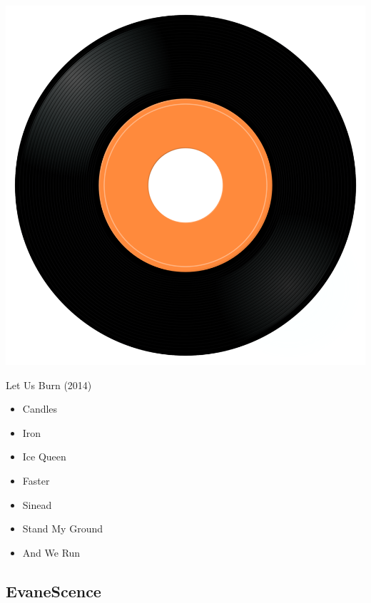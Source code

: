 \begin{minipage}[t]{0.25\textwidth}
\captionsetup{type=figure}
\includegraphics[width=\textwidth]{Images/cover.png}
\caption*{Let Us Burn (2014)}
\end{minipage}
\begin{minipage}[t]{0.25\textwidth}\vspace{0pt}
\begin{itemize}[nosep,leftmargin=1em,labelwidth=*,align=left]
	\setlength{\itemsep}{0pt}
	\item Candles
	\item Iron
	\item Ice Queen
	\item Faster
	\item Sinead
	\item Stand My Ground
	\item And We Run
\end{itemize}
\end{minipage}

\subsection{EvaneScence}

